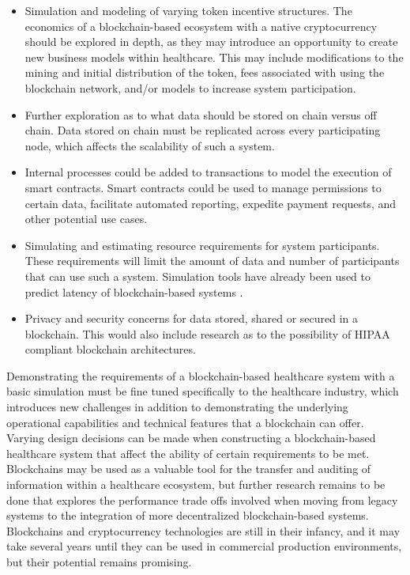 \documentclass[12pt]{report}
\begin{document}
\begin{itemize}
\item Simulation and modeling of varying token incentive structures. The economics of a blockchain-based ecosystem with a native cryptocurrency should be explored in depth, as they may introduce an opportunity to create new business models within healthcare. This may include modifications to the mining and initial distribution of the token, fees associated with using the blockchain network, and/or models to increase system participation.
\item Further exploration as to what data should be stored on chain versus off chain. Data stored on chain must be replicated across every participating node, which affects the scalability of such a system.
\item Internal processes could be added to transactions to model the execution of smart contracts. Smart contracts could be used to manage permissions to certain data, facilitate automated reporting, expedite payment requests, and other potential use cases.
\item Simulating and estimating resource requirements for system participants. These requirements will limit the amount of data and number of participants that can use such a system. Simulation tools have already been used to predict latency of blockchain-based systems \cite{Yasaweerasinghelage.2017}.
\item Privacy and security concerns for data stored, shared or secured in a blockchain. This would also include research as to the possibility of HIPAA compliant blockchain architectures.
\end{itemize}

Demonstrating the requirements of a blockchain-based healthcare system with a basic simulation must be fine tuned specifically to the healthcare industry, which introduces new challenges in addition to demonstrating the underlying operational capabilities and technical features that a blockchain can offer. Varying design decisions can be made when constructing a blockchain-based healthcare system that affect the ability of certain requirements to be met. Blockchains may be used as a valuable tool for the transfer and auditing of information within a healthcare ecosystem, but further research remains to be done that explores the performance trade offs involved when moving from legacy systems to the integration of more decentralized blockchain-based systems. Blockchains and cryptocurrency technologies are still in their infancy, and it may take several years until they can be used in commercial production environments, but their potential remains promising.
\end{document}
